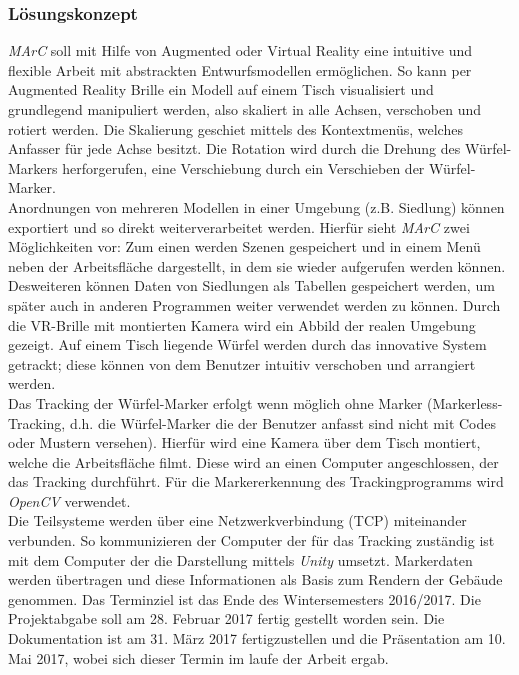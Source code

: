 \subsubsection{Lösungskonzept}
\textit{MArC} soll mit Hilfe von Augmented oder Virtual Reality eine intuitive und flexible Arbeit mit abstrackten Entwurfsmodellen ermöglichen. So kann per Augmented Reality Brille ein Modell auf einem Tisch visualisiert und grundlegend manipuliert werden, also skaliert in alle Achsen, verschoben und rotiert werden. Die Skalierung geschiet mittels des Kontextmenüs, welches Anfasser für jede Achse besitzt. Die Rotation wird durch die Drehung des Würfel-Markers herforgerufen, eine Verschiebung durch ein Verschieben der Würfel-Marker.\\
Anordnungen von mehreren Modellen in einer Umgebung (z.B. Siedlung) können exportiert und so direkt weiterverarbeitet werden.
Hierfür sieht \textit{MArC} zwei Möglichkeiten vor: Zum einen werden Szenen gespeichert und in einem Menü neben der Arbeitsfläche dargestellt, in dem sie wieder aufgerufen werden können. Desweiteren können Daten von Siedlungen als Tabellen gespeichert werden, um später auch in anderen Programmen weiter verwendet werden zu können.
Durch die VR-Brille mit montierten Kamera wird ein Abbild der realen Umgebung gezeigt. Auf einem Tisch liegende Würfel werden durch das innovative System getrackt; diese können von dem Benutzer intuitiv verschoben und arrangiert werden. \\
Das Tracking der Würfel-Marker erfolgt wenn möglich ohne Marker (Markerless-Tracking, d.h. die Würfel-Marker die der Benutzer anfasst sind nicht mit Codes oder Mustern versehen). Hierfür wird eine Kamera über dem Tisch montiert, welche die Arbeitsfläche filmt. Diese wird an einen Computer angeschlossen, der das Tracking durchführt. Für die Markererkennung des Trackingprogramms wird \textit{OpenCV} verwendet.\\ Die Teilsysteme werden über eine Netzwerkverbindung (TCP) miteinander verbunden. So kommunizieren der Computer der für das Tracking zuständig ist mit dem Computer der die Darstellung mittels \textit{Unity} umsetzt. Markerdaten werden übertragen und diese Informationen als Basis zum Rendern der Gebäude genommen. 
Das Terminziel ist das Ende des Wintersemesters 2016/2017. Die Projektabgabe soll am 28. Februar 2017 fertig gestellt worden sein. Die Dokumentation ist am 31. März 2017 fertigzustellen und die Präsentation am 10. Mai 2017, wobei sich dieser Termin im laufe der Arbeit ergab.
 
